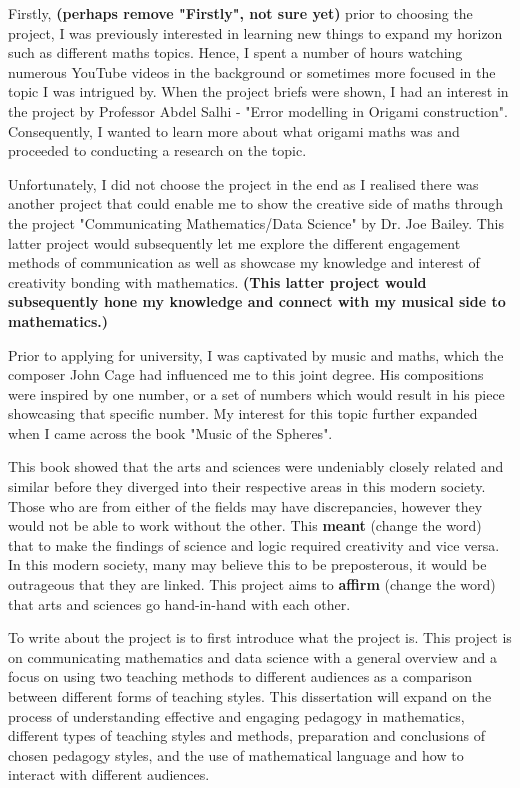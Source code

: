\documentclass[12pt, a4paper,oneside]{book}
\numberwithin{equation}{section}
\begin{document}
Firstly, {\color{blue}\textbf{(perhaps remove "Firstly", not sure yet)}} prior to choosing the project, I was previously interested in learning new things to expand my horizon such as different maths topics. Hence, I spent a number of hours watching numerous YouTube videos in the background or sometimes more focused in the topic I was intrigued by. When the project briefs were shown, I had an interest in the project by Professor Abdel Salhi - "Error modelling in Origami construction". Consequently, I wanted to learn more about what origami maths was and proceeded to conducting a research on the topic.

Unfortunately, I did not choose the project in the end as I realised there was another project that could enable me to show the creative side of maths through the project "Communicating Mathematics/Data Science" by Dr. Joe Bailey. This latter project would subsequently let me explore the different engagement methods of communication as well as showcase my knowledge and interest of creativity bonding with mathematics. {\color{red}\textbf{(This latter project would subsequently hone my knowledge and connect with my musical side to mathematics.)}}

Prior to applying for university, I was captivated by music and maths, which the composer John Cage had influenced me to this joint degree. His compositions were inspired by one number, or a set of numbers which would result in his piece showcasing that specific number. My interest for this topic further expanded when I came across the book "Music of the Spheres".

This book showed that the arts and sciences were undeniably closely related and similar before they diverged into their respective areas in this modern society. Those who are from either of the fields may have discrepancies, however they would not be able to work without the other. This {\color{red}\textbf{meant}} (change the word) that to make the findings of science and logic required creativity and vice versa. In this modern society, many may believe this to be preposterous, it would be outrageous that they are linked. This project aims to {\color{red}\textbf{affirm}} (change the word) that arts and sciences go hand-in-hand with each other.

\newline To write about the project is to first introduce what the project is. This project is on communicating mathematics and data science with a general overview and a focus on using two teaching methods to different audiences as a comparison between different forms of teaching styles. This dissertation will expand on the process of understanding effective and engaging pedagogy in mathematics, different types of teaching styles and methods, preparation and conclusions of chosen pedagogy styles, and the use of mathematical language and how to interact with different audiences.
\end{document}

